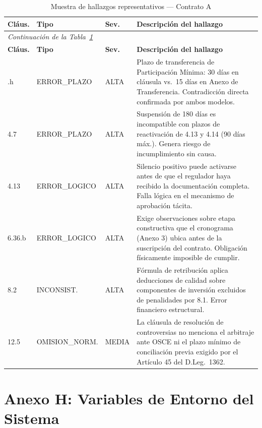 \begin{longtable}{p{1.5cm} p{3.2cm} p{1.2cm} p{7.5cm}}
\caption{Muestra de hallazgos representativos — Contrato A}
\label{tab:muestra_hallazgos} \\
\toprule
\textbf{Cláus.} & \textbf{Tipo} & \textbf{Sev.} & \textbf{Descripción del hallazgo} \\
\midrule
\endfirsthead
\multicolumn{4}{l}{\small\itshape Continuación de la Tabla~\ref{tab:muestra_hallazgos}} \\[4pt]
\toprule
\textbf{Cláus.} & \textbf{Tipo} & \textbf{Sev.} & \textbf{Descripción del hallazgo} \\
\midrule
\endhead
\bottomrule
\endlastfoot
3.3.h &
    ERROR\_PLAZO & ALTA &
    Plazo de transferencia de Participación Mínima: 30 días en cláusula vs.\ 15 días en Anexo de Transferencia. Contradicción directa confirmada por ambos modelos. \\[8pt]
4.7 &
    ERROR\_PLAZO & ALTA &
    Suspensión de 180 días es incompatible con plazos de reactivación de 4.13 y 4.14 (90 días máx.). Genera riesgo de incumplimiento sin causa. \\[8pt]
4.13 &
    ERROR\_LOGICO & ALTA &
    Silencio positivo puede activarse antes de que el regulador haya recibido la documentación completa. Falla lógica en el mecanismo de aprobación tácita. \\[8pt]
6.36.b &
    ERROR\_LOGICO & ALTA &
    Exige observaciones sobre etapa constructiva que el cronograma (Anexo 3) ubica antes de la suscripción del contrato. Obligación físicamente imposible de cumplir. \\[8pt]
8.2 &
    INCONSIST. & ALTA &
    Fórmula de retribución aplica deducciones de calidad sobre componentes de inversión excluidos de penalidades por 8.1. Error financiero estructural. \\[8pt]
12.5 &
    OMISION\_NORM. & MEDIA &
    La cláusula de resolución de controversias no menciona el arbitraje ante OSCE ni el plazo mínimo de conciliación previa exigido por el Artículo 45 del D.Leg.\ 1362. \\
\end{longtable}

\section*{Anexo H: Variables de Entorno del Sistema}

